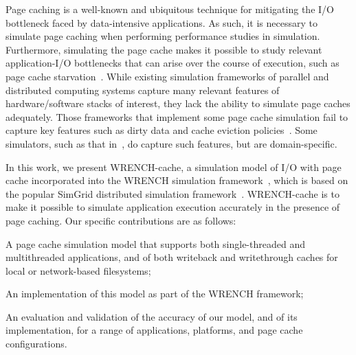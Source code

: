 \documentclass[conference]{IEEEtran}
\begin{document}
        Page caching is a well-known and ubiquitous technique for mitigating the I/O bottleneck
        faced by data-intensive applications. As such, it is necessary to simulate page caching
        when performing performance studies in simulation.
        Furthermore, simulating the page cache makes it possible to study relevant application-I/O
        bottlenecks that can arise over the course of execution, such as page cache
        starvation~\cite{zhuang2017}.
        While existing simulation frameworks of parallel and distributed computing
        systems  capture many relevant features of hardware/software stacks of interest, 
        they lack the ability to simulate page caches adequately. Those frameworks
        that implement some page cache simulation
        fail to capture key features such
        as dirty data and cache eviction policies~\cite{nunez2012simcan,nunez2012icancloud}. 
        Some simulators, such as that in~\cite{xu2018saving}, do capture such features,
        but are domain-specific. 


	In this work, we present WRENCH-cache, a simulation model of I/O
	with page cache incorporated into the WRENCH simulation framework~\cite{casanova2018wrench},
	which is  based on the popular SimGrid distributed simulation framework~\cite{XXX}.
	WRENCH-cache is to make it possible to simulate 
        application execution accurately in the presence of page caching. Our specific 
        contributions are as follows:
    \begin{compactitem}
        \item A page cache simulation model that supports 
	both single-threaded and multithreaded applications, and of both
	writeback and writethrough caches for local or network-based
	filesystems;
        \item An implementation of this model as part of the WRENCH framework; 
        \item An evaluation and validation of the accuracy of our model, and of its implementation,
              for a range of applications, platforms, and page cache configurations. 
    \end{compactitem}
\end{document}
